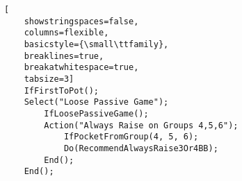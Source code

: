 \begin{lstlisting}[
    showstringspaces=false,
    columns=flexible,
    basicstyle={\small\ttfamily},
    breaklines=true,
    breakatwhitespace=true,
    tabsize=3]   
    IfFirstToPot();   
    Select("Loose Passive Game");
        IfLoosePassiveGame();	
        Action("Always Raise on Groups 4,5,6");
            IfPocketFromGroup(4, 5, 6);
            Do(RecommendAlwaysRaise3Or4BB);
        End();
    End();
\end{lstlisting}
  